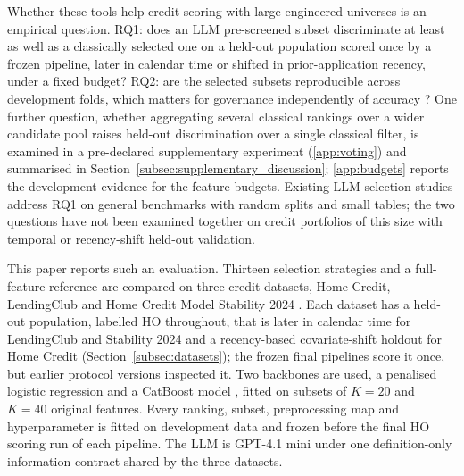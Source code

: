 \documentclass[final,5p,twocolumn]{elsarticle}
\newcommand{\Kfeat}{K}
\begin{document}
Whether these tools help credit scoring with large engineered universes is an empirical question. RQ1: does an LLM pre-screened subset discriminate at least as well as a classically selected one on a held-out population scored once by a frozen pipeline, later in calendar time or shifted in prior-application recency, under a fixed budget? RQ2: are the selected subsets reproducible across development folds, which matters for governance independently of accuracy \cite{kalousis2007,nogueira2018}? One further question, whether aggregating several classical rankings over a wider candidate pool raises held-out discrimination over a single classical filter, is examined in a pre-declared supplementary experiment (\ref{app:voting}) and summarised in Section~\ref{subsec:supplementary_discussion}; \ref{app:budgets} reports the development evidence for the feature budgets. Existing LLM-selection studies address RQ1 on general benchmarks with random splits and small tables; the two questions have not been examined together on credit portfolios of this size with temporal or recency-shift held-out validation.

This paper reports such an evaluation. Thirteen selection strategies and a full-feature reference are compared on three credit datasets, Home Credit, LendingClub and Home Credit Model Stability 2024 \cite{homecredit2018,lendingclub_kaggle,homecredit2024}. Each dataset has a held-out population, labelled HO throughout, that is later in calendar time for LendingClub and Stability 2024 and a recency-based covariate-shift holdout for Home Credit (Section~\ref{subsec:datasets}); the frozen final pipelines score it once, but earlier protocol versions inspected it. Two backbones are used, a penalised logistic regression and a CatBoost model \cite{prokhorenkova2018}, fitted on subsets of $\Kfeat=20$ and $\Kfeat=40$ original features. Every ranking, subset, preprocessing map and hyperparameter is fitted on development data and frozen before the final HO scoring run of each pipeline. The LLM is GPT-4.1 mini \cite{openai2025gpt41} under one definition-only information contract shared by the three datasets.
\end{document}
